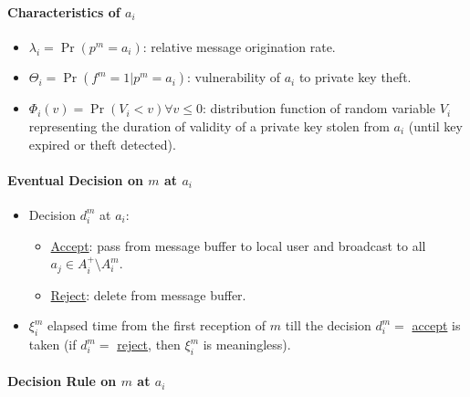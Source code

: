 \documentclass{article}
\begin{document}
\paragraph{Characteristics of \( a_i \)}

\begin{itemize}
    \item \( \lambda_i = \Pr(p^m = a_i) \): relative message origination rate.
    \item \( \Theta_i = \Pr(f^m = 1 | p^m = a_i) \): vulnerability of \( a_i \) to private key theft.
    \item \( \Phi_i(v) = \Pr(V_i < v) \forall v \leq 0\): distribution function of random variable \( V_i \) representing the duration of validity of a private key stolen from \( a_i \) (until key expired or theft detected).
\end{itemize}



\paragraph{Eventual Decision on \( m \) at \( a_i \)}

\begin{itemize}
    \item Decision \( d_i^m \) at \( a_i \):
    \begin{itemize}
        \item \underline{Accept}: pass from message buffer to local user and broadcast to all \( a_j \in A_i^+ \setminus A_i^m \).
        \item \underline{Reject}: delete from message buffer.
    \end{itemize}
    \item \( \xi_i^m \) elapsed time from the first reception of \( m \) till the decision \( d_i^m = \) \underline{accept} is taken (if \( d_i^m = \) \underline{reject}, then \( \xi_i^m \) is meaningless).
\end{itemize}

\paragraph{Decision Rule on \( m \) at \( a_i \)}
\end{document}
